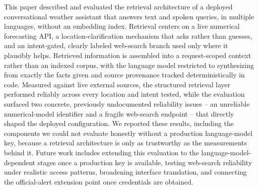 \documentclass[sigconf,natbib=true,anonymous=true]{acmart}
\begin{document}
This paper described and evaluated the retrieval architecture of a deployed conversational weather assistant that answers text and spoken queries, in multiple languages, without an embedding index. Retrieval centers on a live numerical forecasting API, a location-clarification mechanism that asks rather than guesses, and an intent-gated, clearly labeled web-search branch used only where it plausibly helps. Retrieved information is assembled into a request-scoped context rather than an indexed corpus, with the language model restricted to synthesizing from exactly the facts given and source provenance tracked deterministically in code. Measured against live external sources, the structured retrieval layer performed reliably across every location and intent tested, while the evaluation surfaced two concrete, previously undocumented reliability issues -- an unreliable numerical-model identifier and a fragile web-search endpoint -- that directly shaped the deployed configuration. We reported these results, including the components we could not evaluate honestly without a production language-model key, because a retrieval architecture is only as trustworthy as the measurements behind it. Future work includes extending this evaluation to the language-model-dependent stages once a production key is available, testing web-search reliability under realistic access patterns, broadening interface translation, and connecting the official-alert extension point once credentials are obtained.



\end{document}
